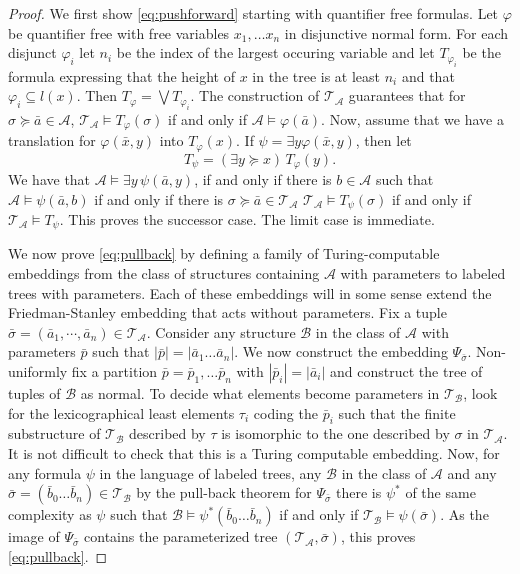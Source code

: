 \documentclass[10pt,a4paper]{amsart}
\renewcommand{\phi}{\varphi}
\providecommand{\A}{\mathcal{A}}
\providecommand{\B}{\mathcal{B}}
\providecommand{\bp}{\bar p}
\providecommand{\ba}{\bar a}
\providecommand{\bb}{\bar b}
\providecommand{\bx}{\bar x}
\newcommand{\T}{{\mathcal{T}}}
\begin{document}
\begin{proof}
   We first show \cref{eq:pushforward} starting with quantifier free formulas.
   Let $\phi$ be quantifier free with free variables $x_1,\dots x_n$ in
   disjunctive normal form. For each disjunct $\phi_i$ let $n_i$ be the index of
   the largest occuring variable and let $T_{\phi_i}$ be the formula expressing
   that the height of $x$ in the tree is at least $n_i$ and that
   $\phi_i\subseteq l(x)$. Then $T_\phi=\bigvee T_{\phi_i}$. The construction of
   $\T_\A$ guarantees that for $\sigma\succeq\ba\in \A$, $\T_\A\models
   T_\phi(\sigma)$ if and only if $\A\models \phi(\ba)$. Now, assume that we
   have a translation for $\phi(\bx,y)$ into $T_\phi(x)$. If $\psi=\exists y
   \phi(\bx,y)$, then let \[T_\psi= (\exists y\succeq x)\, T_\phi(y).\] We have
   that $\A\models \exists y\,\psi(\ba,y)$, if and only if there is $b\in \A$
   such that $\A\models\psi(\ba,b)$ if and only if there is $\sigma\succeq \ba
   \in \T_\A$ $\T_\A\models T_\psi(\sigma)$ if and only if $\T_\A\models
   T_\psi$. This proves the successor case. The limit case is immediate.

   We now prove \cref{eq:pullback} by defining a family of Turing-computable
   embeddings from the class of structures containing $\A$ with parameters to
   labeled trees with parameters. Each of these embeddings will in some sense
   extend the Friedman-Stanley embedding that acts without parameters. Fix a
   tuple $\bar\sigma=(\ba_1,\cdots,\ba_n)\in \T_\A$. Consider any structure $\B$
   in the class of $\A$ with parameters $\bp$ such that
   $|\bp|=|\ba_1\dots\ba_n|$. We now construct the embedding
   $\Psi_{\bar\sigma}$. Non-uniformly fix a partition
   $\bp=\bp_1,\dots\bp_n$ with $|\bp_i|=|\ba_i|$ and construct the tree of
   tuples of $\B$ as normal. To decide what elements become parameters in
   $\T_\B$, look for the lexicographical least elements $\tau_i$ coding the
   $\bp_i$ such that the finite substructure of $\T_\B$ described by $\tau$ is
   isomorphic to the one described by $\sigma$ in $\T_\A$. It is not difficult to check that this is a Turing computable
   embedding. Now, for any formula $\psi$ in the language of labeled trees, any
   $\B$ in the class of $\A$ and any $\bar\sigma=(\bb_0\dots\bb_n)\in \T_\B$ by
   the pull-back theorem for $\Psi_{\bar\sigma}$ there is $\psi^*$ of the same
   complexity as $\psi$ such that $\B\models \psi^*(\bb_0\dots\bb_n)$ if and
   only if $\T_\B\models \psi(\bar\sigma)$. As the image of $\Psi_{\bar\sigma}$
   contains the parameterized tree $(\T_\A,\bar\sigma)$, this proves
   \cref{eq:pullback}.
\end{proof}
\end{document}
